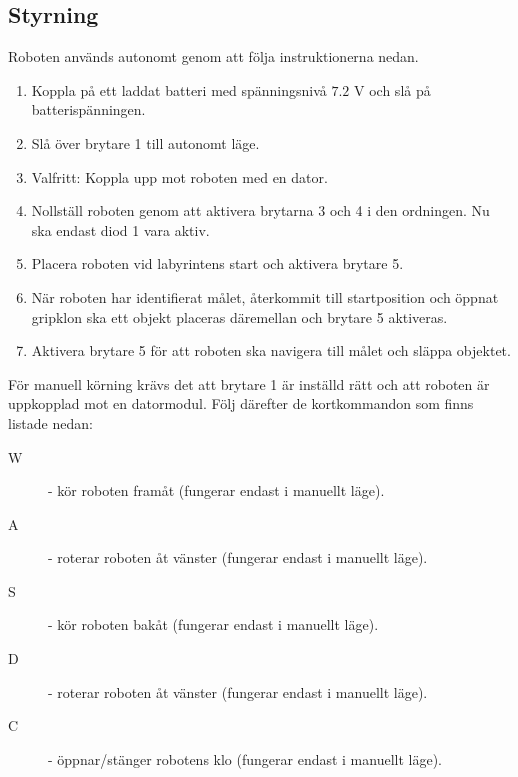 \documentclass[11pt]{article}
\begin{document}
\subsection{Styrning}
\label{shortcuts}
Roboten används autonomt genom att följa instruktionerna nedan.
\begin{enumerate}
    \renewcommand*\labelenumi{\theenumi\vspace{1pt} - }
  \item Koppla på ett laddat batteri med spänningsnivå $7.2$ V och slå på batterispänningen.
  \item Slå över brytare 1 till autonomt läge.
    \renewcommand*\labelenumi{\hspace{1pt} (\theenumi)\vspace{1pt} - }

  \item Valfritt: Koppla upp mot roboten med en dator.
    \renewcommand*\labelenumi{\theenumi\vspace{1pt} - }
  \item Nollställ roboten genom att aktivera brytarna 3 och 4 i den ordningen. Nu ska endast diod 1 vara aktiv.
  \item Placera roboten vid labyrintens start och aktivera brytare 5. 
  \item När roboten har identifierat målet, återkommit till startposition och öppnat gripklon ska ett objekt placeras däremellan och brytare 5 aktiveras.
  \item Aktivera brytare 5 för att roboten ska navigera till målet och släppa objektet. 
\end{enumerate}

För manuell körning krävs det att brytare 1 är inställd rätt och att roboten är uppkopplad mot en datormodul. Följ därefter de kortkommandon som finns listade nedan:
\vspace{2em}
\begin{description}
	\item[W] - kör roboten framåt (fungerar endast i manuellt läge).
	\item[A] - roterar roboten åt vänster (fungerar endast i manuellt läge).
	\item[S] - kör roboten bakåt (fungerar endast i manuellt läge).
	\item[D] - roterar roboten åt vänster (fungerar endast i manuellt läge).
	\item[C] - öppnar/stänger robotens klo (fungerar endast i manuellt läge).
\end{description}
\end{document}
